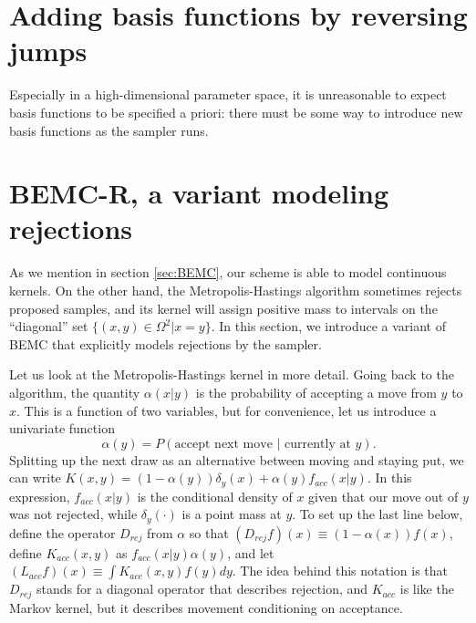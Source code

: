 \documentclass{article}
\begin{document}
\section{Adding basis functions by reversing jumps}
\label{sec:reverse_jumps}

Especially in a high-dimensional parameter space, it is unreasonable to expect basis functions to be specified a priori: there must be some way to introduce new basis functions as the sampler runs. 

\section{BEMC-R, a variant modeling rejections}
\label{sec:BEMC-R}

As we mention in section \ref{sec:BEMC}, our scheme is able to model continuous kernels. On the other hand, the Metropolis-Hastings algorithm sometimes rejects proposed samples, and its kernel will assign positive mass to intervals on the ``diagonal'' set $\{(x,y) \in \Omega^2 | x=y\}$. In this section, we introduce a variant of BEMC that explicitly models rejections by the sampler. 

Let us look at the Metropolis-Hastings kernel in more detail. Going back to the algorithm, the quantity $\alpha(x|y)$ is the probability of accepting a move from $y$ to $x$. This is a function of two variables, but for convenience, let us introduce a univariate function $$\alpha(y)=P(\text{accept next move $|$ currently at }y).$$ Splitting up the next draw as an alternative between moving and staying put, we can write $K(x, y) = (1-\alpha(y))\delta_{y}(x) + \alpha(y)f_{acc}(x|y)$. In this expression, $f_{acc}(x|y)$ is the conditional density of $x$ given that our move out of $y$ was not rejected, while $\delta_y(\cdot)$ is a point mass at $y$. %
To set up the last line below, define the operator $D_{rej}$ from $\alpha$ so that $(D_{rej}f)(x)\equiv (1-\alpha(x))f(x)$, define $K_{acc}(x,y)$ as $f_{acc}(x|y)\alpha(y)$, and let $(L_{acc}f)(x)\equiv \int K_{acc}(x,y)f(y)dy$. The idea behind this notation is that $D_{rej}$ stands for a diagonal operator that describes rejection, and $K_{acc}$ is like the Markov kernel, but it describes movement conditioning on acceptance.
\end{document}
